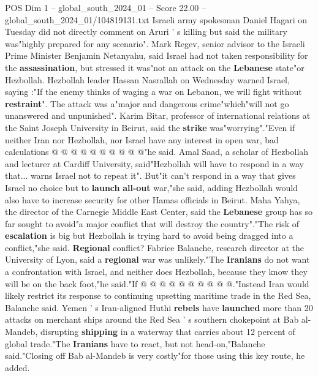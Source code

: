 \begin{textsample}{POS Dim 1 – global\_south\_2024\_01 – Score 22.00 – global\_south\_2024\_01/104819131.txt}
Israeli army spokesman Daniel Hagari on Tuesday did not directly comment on Aruri ' s killing but said the military was"highly prepared for any scenario".
Mark Regev, senior advisor to the Israeli Prime Minister Benjamin Netanyahu, said Israel had not taken responsibility for the \textbf{assassination}, but stressed it was"not an attack on the \textbf{Lebanese} state"or Hezbollah.
Hezbollah leader Hassan Nasrallah on Wednesday warned Israel, saying :"If the enemy thinks of waging a war on Lebanon, we will fight without \textbf{restraint}".
The attack was a"major and dangerous crime"which"will not go unanswered and unpunished".
Karim Bitar, professor of international relations at the Saint Joseph University in Beirut, said the \textbf{strike} was"worrying"."Even if neither Iran nor Hezbollah, nor Israel have any interest in open war, bad calculations @ @ @ @ @ @ @ @ @ @"he said.
Amal Saad, a scholar of Hezbollah and lecturer at Cardiff University, said"Hezbollah will have to respond in a way that... warns Israel not to repeat it".
But"it can't respond in a way that gives Israel no choice but to \textbf{launch} \textbf{all-out} war,"she said, adding Hezbollah would also have to increase security for other Hamas officials in Beirut.
Maha Yahya, the director of the Carnegie Middle East Center, said the \textbf{Lebanese} group has so far sought to avoid"a major conflict that will destroy the country"."The risk of \textbf{escalation} is big but Hezbollah is trying hard to avoid being dragged into a conflict,"she said. \textbf{Regional} conflict?
Fabrice Balanche, research director at the University of Lyon, said a \textbf{regional} war was unlikely."The \textbf{Iranians} do not want a confrontation with Israel, and neither does Hezbollah, because they know they will be on the back foot,"he said."If @ @ @ @ @ @ @ @ @ @."Instead Iran would likely restrict its response to continuing upsetting maritime trade in the Red Sea, Balanche said.
Yemen ' s Iran-aligned Huthi \textbf{rebels} have \textbf{launched} more than 20 attacks on merchant ships around the Red Sea ' s southern chokepoint at Bab al-Mandeb, disrupting \textbf{shipping} in a waterway that carries about 12 percent of global trade."The \textbf{Iranians} have to react, but not head-on,"Balanche said."Closing off Bab al-Mandeb is very costly"for those using this key route, he added.

\end{textsample}
